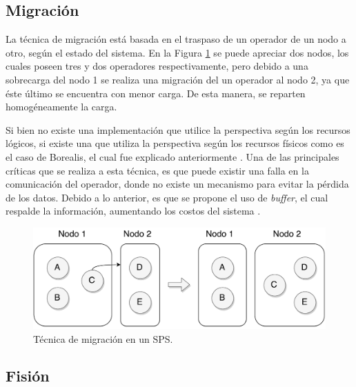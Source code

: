 \subsection{Migración}
\label{sec:migracionBC}

La técnica de migración está basada en el traspaso de un operador de un nodo a otro, según el estado del sistema. En la Figura \ref{fig:migracion} se puede apreciar dos nodos, los cuales poseen tres y dos operadores respectivamente, pero debido a una sobrecarga del nodo 1 se realiza una migración del un operador al nodo 2, ya que \normalsize{éste último} se encuentra con menor carga. De esta manera, se reparten homogéneamente la carga.

Si bien no existe una implementación que utilice la perspectiva según los recursos lógicos, si existe una que utiliza la perspectiva según los recursos físicos como es el caso de Borealis, el cual fue explicado anteriormente \citep{XingZH05}. Una de las principales críticas que se realiza a esta técnica, es que puede existir una falla en la comunicación del operador, donde no existe un mecanismo para evitar la pérdida de los datos. Debido a lo anterior, es que se propone el uso de \textit{buffer}, el cual respalde la información, aumentando los costos del sistema \citep{PittauACA07}.

\begin{figure}[!ht]
	\centering
	\includegraphics[scale=0.45]{images/Migracion.pdf}
	\caption{Técnica de migración en un SPS.}
	\label{fig:migracion}
\end{figure}

\subsection{Fisión}
\label{sec:fisionBC}


